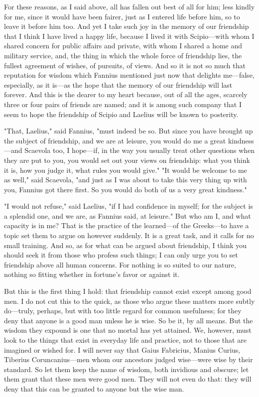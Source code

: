  For these reasons, as I said above, all has fallen out best of all for him; less kindly for me, since it would have been fairer, just as I entered life before him, so to leave it before him too. And yet I take such joy in the memory of our friendship that I think I have lived a happy life, because I lived it with Scipio—with whom I shared concern for public affairs and private, with whom I shared a home and military service, and, the thing in which the whole force of friendship lies, the fullest agreement of wishes, of pursuits, of views. And so it is not so much that reputation for wisdom which Fannius mentioned just now that delights me—false, especially, as it is—as the hope that the memory of our friendship will last forever. And this is the dearer to my heart because, out of all the ages, scarcely three or four pairs of friends are named; and it is among such company that I seem to hope the friendship of Scipio and Laelius will be known to posterity.

 "That, Laelius," said Fannius, "must indeed be so. But since you have brought up the subject of friendship, and we are at leisure, you would do me a great kindness—and Scaevola too, I hope—if, in the way you usually treat other questions when they are put to you, you would set out your views on friendship: what you think it is, how you judge it, what rules you would give." "It would be welcome to me as well," said Scaevola, "and just as I was about to take this very thing up with you, Fannius got there first. So you would do both of us a very great kindness."

 "I would not refuse," said Laelius, "if I had confidence in myself; for the subject is a splendid one, and we are, as Fannius said, at leisure." But who am I, and what capacity is in me? That is the practice of the learned—of the Greeks—to have a topic set them to argue on however suddenly. It is a great task, and it calls for no small training. And so, as for what can be argued about friendship, I think you should seek it from those who profess such things; I can only urge you to set friendship above all human concerns. For nothing is so suited to our nature, nothing so fitting whether in fortune's favor or against it.

 But this is the first thing I hold: that friendship cannot exist except among good men. I do not cut this to the quick, as those who argue these matters more subtly do—truly, perhaps, but with too little regard for common usefulness; for they deny that anyone is a good man unless he is wise. So be it, by all means. But the wisdom they expound is one that no mortal has yet attained. We, however, must look to the things that exist in everyday life and practice, not to those that are imagined or wished for. I will never say that Gaius Fabricius, Manius Curius, Tiberius Coruncanius—men whom our ancestors judged wise—were wise by their standard. So let them keep the name of wisdom, both invidious and obscure; let them grant that these men were good men. They will not even do that: they will deny that this can be granted to anyone but the wise man.

